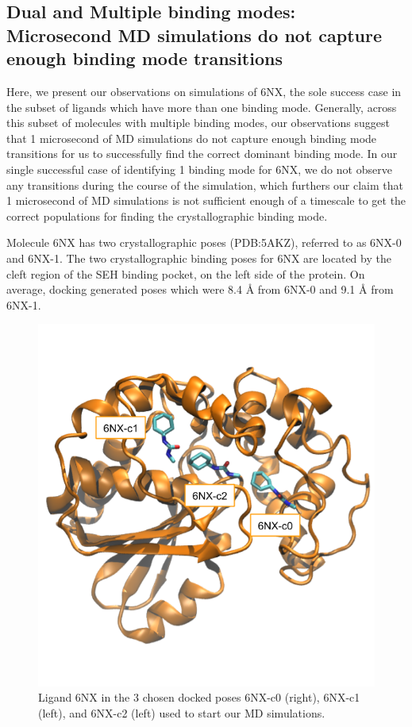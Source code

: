 \subsection{Dual and Multiple binding modes: Microsecond MD simulations do not capture enough binding mode transitions}
Here, we present our observations on simulations of 6NX, the sole success case in the subset of ligands which have more than one binding mode.
Generally, across this subset of molecules with multiple binding modes, our observations suggest that 1 microsecond of MD simulations do not capture enough binding mode transitions for us to successfully find the correct dominant binding mode.
In our single successful case of identifying 1 binding mode for 6NX, we do not observe any transitions during the course of the simulation, which furthers our claim that 1 microsecond of MD simulations is not sufficient enough of a timescale to get the correct populations for finding the crystallographic binding mode.

Molecule 6NX has two crystallographic poses (PDB:5AKZ), referred to as 6NX-0 and 6NX-1.
The two crystallographic binding poses for 6NX are located by the cleft region of the SEH binding pocket, on the left side of the protein. 
On average, docking generated poses which were 8.4 {\AA} from 6NX-0 and 9.1 {\AA} from 6NX-1. 

\begin{figure}
    \centering
    \includegraphics[width=\linewidth]{chapter5/6NX/6NX-docked-label.png}
    \caption[Ligand 6NX Docked Poses]{Ligand 6NX in the 3 chosen docked poses 6NX-c0 (right), 6NX-c1 (left), and 6NX-c2 (left) used to start our MD simulations.}
    \label{fig:6NX-docked}
\end{figure}

